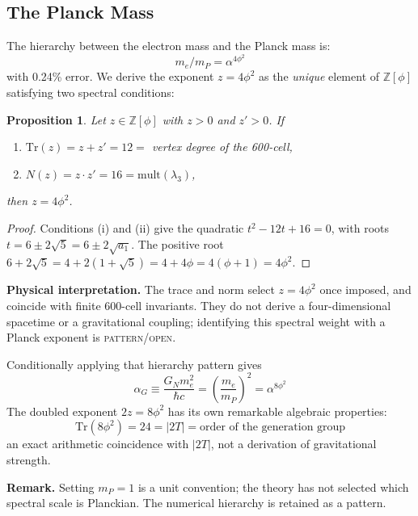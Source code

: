 \documentclass[12pt,a4paper]{article}
\newtheorem{proposition}{Proposition}
\theoremstyle{definition}
\begin{document}
\subsection{The Planck Mass}

The hierarchy between the electron mass and the Planck mass is:
\begin{equation}
\boxed{m_e / m_P = \alpha^{4\phi^2}}
\label{eq:planck}
\end{equation}
with 0.24\% error. We derive the exponent $z = 4\phi^2$ as the \emph{unique} element of $\mathbb{Z}[\phi]$ satisfying two spectral conditions:

\begin{proposition}
Let $z \in \mathbb{Z}[\phi]$ with $z > 0$ and $z' > 0$. If
\begin{enumerate}
\item[(i)] $\mathrm{Tr}(z) = z + z' = 12 = $ vertex degree of the 600-cell,
\item[(ii)] $N(z) = z \cdot z' = 16 = \mathrm{mult}(\lambda_3)$,
\end{enumerate}
then $z = 4\phi^2$.
\end{proposition}

\begin{proof}
Conditions (i) and (ii) give the quadratic $t^2 - 12t + 16 = 0$, with roots $t = 6 \pm 2\sqrt{5} = 6 \pm 2\sqrt{a_1}$. The positive root $6 + 2\sqrt{5} = 4 + 2(1 + \sqrt{5}) = 4 + 4\phi = 4(\phi + 1) = 4\phi^2$.
\end{proof}

\textbf{Physical interpretation.} The trace and norm select $z=4\phi^2$ once imposed, and coincide with finite 600-cell invariants.  They do not derive a four-dimensional spacetime or a gravitational coupling; identifying this spectral weight with a Planck exponent is \textsc{pattern/open}.

Conditionally applying that hierarchy pattern gives
\begin{equation}
\alpha_G \equiv \frac{G_N m_e^2}{\hbar c} = \left(\frac{m_e}{m_P}\right)^2 = \alpha^{8\phi^2}
\end{equation}
The doubled exponent $2z = 8\phi^2$ has its own remarkable algebraic properties:
\begin{equation}
\text{Tr}(8\phi^2) = 24 = |2T| = \text{order of the generation group}
\end{equation}
an exact arithmetic coincidence with $|2T|$, not a derivation of gravitational strength.

\textbf{Remark.}  Setting $m_P=1$ is a unit convention; the theory has not selected which spectral scale is Planckian.  The numerical hierarchy is retained as a pattern.
\end{document}
